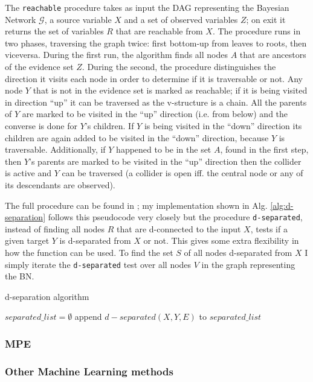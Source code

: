 The \texttt{reachable} procedure takes as input the DAG representing the Bayesian Network $\mathcal{G}$, a source variable $X$ and a set of observed variables $Z$; on exit it returns the set of variables $R$ that are reachable from $X$.
The procedure runs in two phases, traversing the graph twice: first bottom-up from leaves to roots, then viceversa.
During the first run, the algorithm finds all nodes $A$ that are ancestors of the evidence set $Z$.
During the second, the procedure distinguishes the direction it visits each node in order to determine if it is traversable or not.
Any node $Y$ that is not in the evidence set is marked as reachable; if it is being visited in direction \enquote{up} it can be traversed as the v-structure is a chain.
All the parents of $Y$ are marked to be visited in the \enquote{up} direction (i.e. from below) and the converse is done for $Y$'s children.
If $Y$ is being visited in the \enquote{down} direction its children are again added to be visited in the \enquote{down} direction, because $Y$ is traversable.
Additionally, if $Y$ happened to be in the set $A$, found in the first step, then $Y$'s parents are marked to be visited in the \enquote{up} direction then the collider is active and $Y$ can be traversed (a collider is open iff. the central node or any of its descendants are observed).

The full procedure can be found in \cite{koller2007dseparation}; my implementation shown in Alg. \ref{alg:d-separation} follows this pseudocode very closely but the procedure \texttt{d-separated}, instead of finding all nodes $R$ that are d-connected to the input $X$, tests if a given target $Y$ is d-separated from $X$ or not.
This gives some extra flexibility in how the function can be used.
To find the set $S$ of all nodes d-separated from $X$ I simply iterate the \texttt{d-separated} test over all nodes $V$ in the graph representing the BN.

\begin{algorithm}[htp!]
	\caption{d-separation algorithm}
	\label{alg:d-separation}
	\begin{algorithmic}[1]
		\State $separated\_list = \emptyset$
			\State append $d-separated(X, Y, E)$ to $separated\_list$ 
		\EndFor
	\end{algorithmic}
\end{algorithm}

\subsubsection{MPE}

\subsubsection{Other Machine Learning methods}


